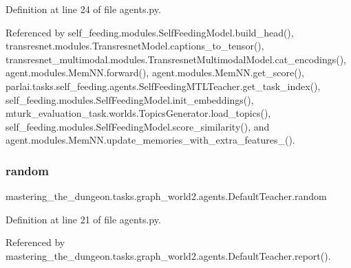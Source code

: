 Definition at line 24 of file agents.\+py.



Referenced by self\+\_\+feeding.\+modules.\+Self\+Feeding\+Model.\+build\+\_\+head(), transresnet.\+modules.\+Transresnet\+Model.\+captions\+\_\+to\+\_\+tensor(), transresnet\+\_\+multimodal.\+modules.\+Transresnet\+Multimodal\+Model.\+cat\+\_\+encodings(), agent.\+modules.\+Mem\+N\+N.\+forward(), agent.\+modules.\+Mem\+N\+N.\+get\+\_\+score(), parlai.\+tasks.\+self\+\_\+feeding.\+agents.\+Self\+Feeding\+M\+T\+L\+Teacher.\+get\+\_\+task\+\_\+index(), self\+\_\+feeding.\+modules.\+Self\+Feeding\+Model.\+init\+\_\+embeddings(), mturk\+\_\+evaluation\+\_\+task.\+worlds.\+Topics\+Generator.\+load\+\_\+topics(), self\+\_\+feeding.\+modules.\+Self\+Feeding\+Model.\+score\+\_\+similarity(), and agent.\+modules.\+Mem\+N\+N.\+update\+\_\+memories\+\_\+with\+\_\+extra\+\_\+features\+\_\+().

\mbox{\label{classmastering__the__dungeon_1_1tasks_1_1graph__world2_1_1agents_1_1DefaultTeacher_a6f9448f05879201f84765bbdb1cba40b}} 
\subsubsection{\texorpdfstring{random}{random}}
{\footnotesize\ttfamily mastering\+\_\+the\+\_\+dungeon.\+tasks.\+graph\+\_\+world2.\+agents.\+Default\+Teacher.\+random}



Definition at line 21 of file agents.\+py.



Referenced by mastering\+\_\+the\+\_\+dungeon.\+tasks.\+graph\+\_\+world2.\+agents.\+Default\+Teacher.\+report().

\mbox{\label{classmastering__the__dungeon_1_1tasks_1_1graph__world2_1_1agents_1_1DefaultTeacher_ac9ecf0a05baa781db7802c489c4e9599}} 

